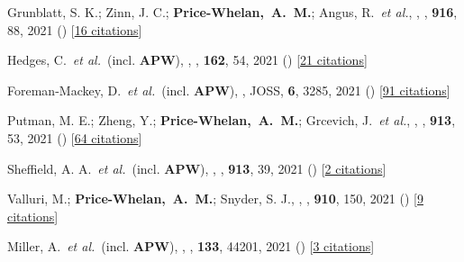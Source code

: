 \item[{\color{deemph}\scriptsize78}]Grunblatt, S. K.; Zinn, J. C.; \textbf{Price-Whelan,~A.~M.}; Angus, R.~\textit{et al.}, , \apj, \textbf{916}, 88, 2021 () [\href{http://adsabs.harvard.edu/abs/2021ApJ...916...88G}{16 citations}]

\item[{\color{deemph}\scriptsize77}]Hedges, C.~\textit{et al.}~(incl. \textbf{APW}), , \aj, \textbf{162}, 54, 2021 () [\href{http://adsabs.harvard.edu/abs/2021AJ....162...54H}{21 citations}]

\item[{\color{deemph}\scriptsize76}]Foreman-Mackey, D.~\textit{et al.}~(incl. \textbf{APW}), , JOSS, \textbf{6}, 3285, 2021 () [\href{http://adsabs.harvard.edu/abs/2021JOSS....6.3285F}{91 citations}]

\item[{\color{deemph}\scriptsize75}]Putman, M. E.; Zheng, Y.; \textbf{Price-Whelan,~A.~M.}; Grcevich, J.~\textit{et al.}, , \apj, \textbf{913}, 53, 2021 () [\href{http://adsabs.harvard.edu/abs/2021ApJ...913...53P}{64 citations}]

\item[{\color{deemph}\scriptsize74}]Sheffield, A. A.~\textit{et al.}~(incl. \textbf{APW}), , \apj, \textbf{913}, 39, 2021 () [\href{http://adsabs.harvard.edu/abs/2021ApJ...913...39S}{2 citations}]

\item[{\color{deemph}\scriptsize73}]Valluri, M.; \textbf{Price-Whelan,~A.~M.}; Snyder, S. J., , \apj, \textbf{910}, 150, 2021 () [\href{http://adsabs.harvard.edu/abs/2021ApJ...910..150V}{9 citations}]

\item[{\color{deemph}\scriptsize72}]Miller, A.~\textit{et al.}~(incl. \textbf{APW}), , \pasp, \textbf{133}, 44201, 2021 () [\href{http://adsabs.harvard.edu/abs/2021PASP..133d4201M}{3 citations}]


